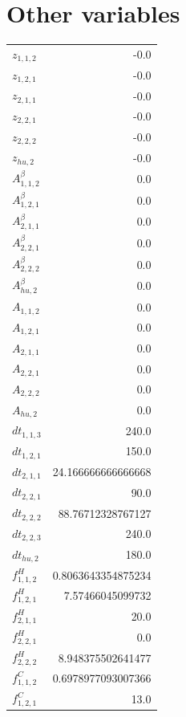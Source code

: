 \documentclass{article}%
\makeatletter
\let\mcnewpage=\newpage%
\newcommand{\TrickSupertabularIntoMulticols}{%
\renewcommand\newpage{%
\if@firstcolumn%
\hrule width\linewidth height0pt%
\columnbreak%
\else%
\mcnewpage%
\fi%
}%
}%
\makeatother
\begin{document}
\section{Other variables}%
\thispagestyle{plain}%
\begin{multicols*}{3}%
\TrickSupertabularIntoMulticols%
%
\begin{supertabular}{lr}%
	$z_{1,1,2}$ & -0.0 \\%
	$z_{1,2,1}$ & -0.0 \\%
	$z_{2,1,1}$ & -0.0 \\%
	$z_{2,2,1}$ & -0.0 \\%
	$z_{2,2,2}$ & -0.0 \\%
	$z_{hu,2}$ & -0.0 \\%
	$A_{1,1,2}^{\beta}$ & 0.0 \\%
	$A_{1,2,1}^{\beta}$ & 0.0 \\%
	$A_{2,1,1}^{\beta}$ & 0.0 \\%
	$A_{2,2,1}^{\beta}$ & 0.0 \\%
	$A_{2,2,2}^{\beta}$ & 0.0 \\%
	$A_{hu,2}^{\beta}$ & 0.0 \\%
	$A_{1,1,2}$ & 0.0 \\%
	$A_{1,2,1}$ & 0.0 \\%
	$A_{2,1,1}$ & 0.0 \\%
	$A_{2,2,1}$ & 0.0 \\%
	$A_{2,2,2}$ & 0.0 \\%
	$A_{hu,2}$ & 0.0 \\%
	$dt_{1,1,3}$ & 240.0 \\%
	$dt_{1,2,1}$ & 150.0 \\%
	$dt_{2,1,1}$ & 24.166666666666668 \\%
	$dt_{2,2,1}$ & 90.0 \\%
	$dt_{2,2,2}$ & 88.76712328767127 \\%
	$dt_{2,2,3}$ & 240.0 \\%
	$dt_{hu,2}$ & 180.0 \\%
	$f_{1,1,2}^{H}$ & 0.8063643354875234 \\%
	$f_{1,2,1}^{H}$ & 7.57466045099732 \\%
	$f_{2,1,1}^{H}$ & 20.0 \\%
	$f_{2,2,1}^{H}$ & 0.0 \\%
	$f_{2,2,2}^{H}$ & 8.948375502641477 \\%
	$f_{1,1,2}^{C}$ & 0.6978977093007366 \\%
	$f_{1,2,1}^{C}$ & 13.0 \\%

\end{supertabular}
\end{multicols*}
\end{document}
